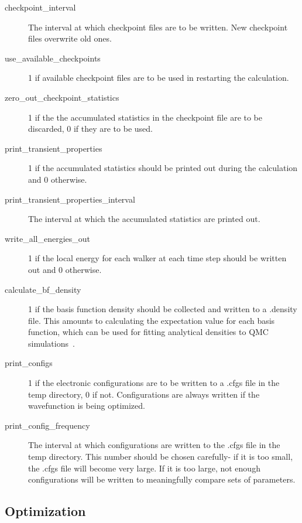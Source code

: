 \documentclass[11pt]{article}
\begin{document}
\begin{description}
\item [checkpoint\_interval] The interval at which checkpoint files are
  to be written.  New checkpoint files overwrite old ones.  

\item [use\_available\_checkpoints] 1 if available checkpoint files are
  to be used in restarting the calculation.

\item [zero\_out\_checkpoint\_statistics] 1 if the the accumulated
  statistics in the checkpoint file are to be discarded, 0 if they are
  to be used.

\item [print\_transient\_properties] 1 if the accumulated statistics
  should be printed out during the calculation and 0 otherwise.

\item [print\_transient\_properties\_interval] The interval at which the
  accumulated statistics are printed out.

\item [write\_all\_energies\_out] 1 if the local energy for each
  walker at each time step should be written out and 0 otherwise.

\item [calculate\_bf\_density] 1 if the basis function density should be
  collected and written to a .density file.  This amounts to
  calculating the expectation value for each basis function, which can
  be used for fitting analytical densities to QMC
  simulations~\cite{AnalyticalDensity}.

\item [print\_configs] 1 if the electronic configurations are to be
  written to a .cfgs file in the temp directory, 0 if not.
  Configurations are always written if the wavefunction is being
  optimized.  

\item [print\_config\_frequency] The interval at which configurations are
  written to the .cfgs file in the temp directory.  This number should
  be chosen carefully- if it is too small, the .cfgs file will become
  very large.  If it is too large, not enough configurations will be
  written to meaningfully compare sets of parameters.  

\end{description}

\subsection{Optimization}
\end{document}
